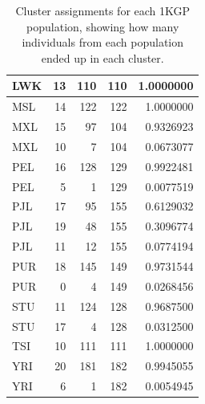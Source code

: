 \begin{table}[ht]
{\begin{tabular}{l|r|r|r|r}
\hline
LWK & 13 & 110 & 110 & 1.0000000\\
\hline
MSL & 14 & 122 & 122 & 1.0000000\\
\hline
MXL & 15 & 97 & 104 & 0.9326923\\
\hline
MXL & 10 & 7 & 104 & 0.0673077\\
\hline
PEL & 16 & 128 & 129 & 0.9922481\\
\hline
PEL & 5 & 1 & 129 & 0.0077519\\
\hline
PJL & 17 & 95 & 155 & 0.6129032\\
\hline
PJL & 19 & 48 & 155 & 0.3096774\\
\hline
PJL & 11 & 12 & 155 & 0.0774194\\
\hline
PUR & 18 & 145 & 149 & 0.9731544\\
\hline
PUR & 0 & 4 & 149 & 0.0268456\\
\hline
STU & 11 & 124 & 128 & 0.9687500\\
\hline
STU & 17 & 4 & 128 & 0.0312500\\
\hline
TSI & 10 & 111 & 111 & 1.0000000\\
\hline
YRI & 20 & 181 & 182 & 0.9945055\\
\hline
YRI & 6 & 1 & 182 & 0.0054945\\
\hline
\end{tabular}}
\caption[Cluster assignments for each 1KGP population]{Cluster assignments for each 1KGP population, showing how many individuals from each population ended up in each cluster.}
\label{table:1kgp_clusters} 
\end{table} 

\clearpage

